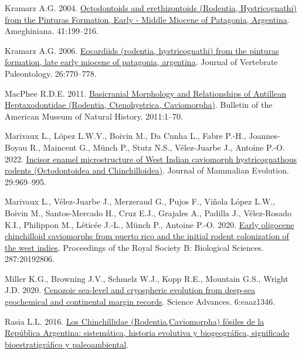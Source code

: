 \documentclass[
  9pt,
  letterpaper,
]{article}
\newlength{\cslhangindent}
\newenvironment{CSLReferences}[2] %
 {\begin{list}{}{%
  \setlength{\itemindent}{0pt}
  \setlength{\leftmargin}{0pt}
  \setlength{\parsep}{0pt}
  \ifodd #1
   \setlength{\leftmargin}{\cslhangindent}
   \setlength{\itemindent}{-1\cslhangindent}
  \fi
  \setlength{\itemsep}{#2\baselineskip}}}
 {\end{list}}
\begin{document}
\begin{CSLReferences}{1}{1}
Kramarz A.G. 2004.
\href{https://www.ameghiniana.org.ar/index.php/ameghiniana/article/view/815}{Octodontoids
and erethizontoids (Rodentia, Hystricognathi) from the Pinturas
Formation, Early - Middle Miocene of Patagonia, Argentina}. Ameghiniana.
41:199--216.

Kramarz A.G. 2006.
\href{https://www.jstor.org/stable/4524620}{Eocardiids (rodentia,
hystricognathi) from the pinturas formation, late early miocene of
patagonia, argentina}. Journal of Vertebrate Paleontology. 26:770--778.

MacPhee R.D.E. 2011.
\href{https://doi.org/10.1206/0003-0090-363.1.1}{{B}asicranial
{M}orphology and {R}elationships of {A}ntillean {H}eptaxodontidae
({R}odentia, {C}tenohystrica, {C}aviomorpha)}. Bulletin of the American
Museum of Natural History. 2011:1--70.

Marivaux L., López L.W.V., Boivin M., Da Cunha L., Fabre P.-H.,
Joannes-Boyau R., Maincent G., Münch P., Stutz N.S., Vélez-Juarbe J.,
Antoine P.-O. 2022.
\href{https://doi.org/10.1007/s10914-022-09631-7}{{I}ncisor enamel
microstructure of {W}est {I}ndian caviomorph hystricognathous rodents
({O}ctodontoidea and {C}hinchilloidea)}. Journal of Mammalian Evolution.
29:969--995.

Marivaux L., Vélez-Juarbe J., Merzeraud G., Pujos F., Viñola López L.W.,
Boivin M., Santos-Mercado H., Cruz E.J., Grajales A., Padilla J.,
Vélez-Rosado K.I., Philippon M., Léticée J.-L., Münch P., Antoine P.-O.
2020. \href{https://doi.org/10.1098/rspb.2019.2806}{Early oligocene
chinchilloid caviomorphs from puerto rico and the initial rodent
colonization of the west indies}. Proceedings of the Royal Society B:
Biological Sciences. 287:20192806.

Miller K.G., Browning J.V., Schmelz W.J., Kopp R.E., Mountain G.S.,
Wright J.D. 2020. \href{https://doi.org/10.1126/sciadv.aaz1346}{Cenozoic
sea-level and cryospheric evolution from deep-sea geochemical and
continental margin records}. Science Advances. 6:eaaz1346.

Rasia L.L. 2016. \href{https://doi.org/10.35537/10915/54323}{Los
Chinchillidae (Rodentia,Caviomorpha) fósiles de la República Argentina:
sistemática, historia evolutiva y biogeográfica, significado
bioestratigráfico y paleoambiental}.


\end{CSLReferences}
\end{document}
